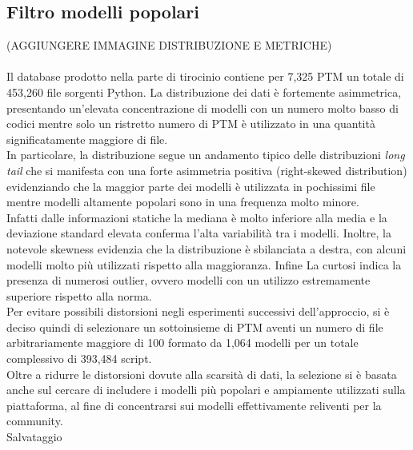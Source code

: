 \documentclass{article}
\begin{document}
\subsection{Filtro modelli popolari}
(AGGIUNGERE IMMAGINE DISTRIBUZIONE E METRICHE)\\
\\
Il database prodotto nella parte di tirocinio contiene per 7,325 PTM un totale di 453,260 file sorgenti Python. La distribuzione dei dati è fortemente asimmetrica, presentando un'elevata concentrazione di modelli con un numero molto basso di codici mentre solo un ristretto numero di PTM è utilizzato in una quantità significatamente maggiore di file.\\
In particolare, la distribuzione segue un andamento tipico delle distribuzioni \textit{long tail} che si manifesta con una forte asimmetria positiva (right-skewed distribution) evidenziando che la maggior parte dei modelli è utilizzata in pochissimi file mentre modelli altamente popolari sono in una frequenza molto minore.\\
Infatti dalle informazioni statiche la mediana è molto inferiore alla media e la deviazione standard elevata conferma l'alta variabilità tra i modelli. Inoltre, la notevole skewness evidenzia che la distribuzione è sbilanciata a destra, con alcuni modelli molto più utilizzati rispetto alla maggioranza. Infine La curtosi indica la presenza di numerosi outlier, ovvero modelli con un utilizzo estremamente superiore rispetto alla norma.\\
Per evitare possibili distorsioni negli esperimenti successivi dell'approccio, si è deciso quindi di selezionare un sottoinsieme di PTM aventi un numero di file arbitrariamente maggiore di 100 formato da 1,064 modelli per un totale complessivo di 393,484 script.\\
Oltre a ridurre le distorsioni dovute alla scarsità di dati, la selezione si è basata anche sul cercare di includere i modelli più popolari e ampiamente utilizzati sulla piattaforma, al fine di concentrarsi sui modelli effettivamente reliventi per la community.\\
Salvataggio
\end{document}
